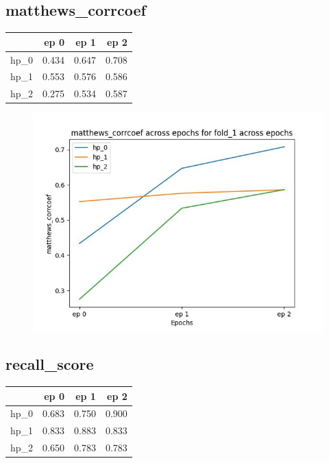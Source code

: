 \documentclass{article}
\begin{document}
\subsection{matthews\_corrcoef}
\begin{tabular}{lrrr}
\toprule
{} &   ep 0 &   ep 1 &   ep 2 \\
\midrule
hp\_0 &  0.434 &  0.647 &  0.708 \\
hp\_1 &  0.553 &  0.576 &  0.586 \\
hp\_2 &  0.275 &  0.534 &  0.587 \\
\bottomrule
\end{tabular}

\begin{figure}[H]
\includegraphics[scale = 0.75]{fold_1/matthews_corrcoef}
\end{figure}
\subsection{recall\_score}
\begin{tabular}{lrrr}
\toprule
{} &   ep 0 &   ep 1 &   ep 2 \\
\midrule
hp\_0 &  0.683 &  0.750 &  0.900 \\
hp\_1 &  0.833 &  0.883 &  0.833 \\
hp\_2 &  0.650 &  0.783 &  0.783 \\
\bottomrule
\end{tabular}
\end{document}
